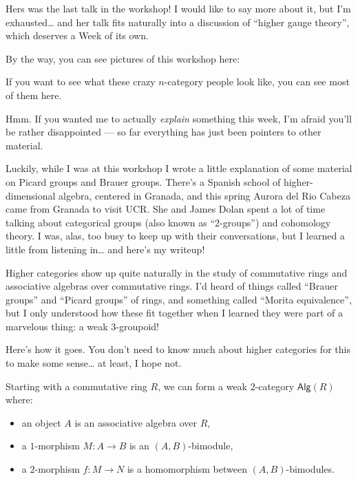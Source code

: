 \documentclass{article}
\def\tightlist{}
\renewcommand{\texttt}[1]{%
  \begingroup
  \ttfamily
  \begingroup\lccode`~=`/\lowercase{\endgroup\def~}{/\discretionary{}{}{}}%
  \begingroup\lccode`~=`[\lowercase{\endgroup\def~}{[\discretionary{}{}{}}%
  \begingroup\lccode`~=`.\lowercase{\endgroup\def~}{.\discretionary{}{}{}}%
  \catcode`/=\active\catcode`[=\active\catcode`.=\active
  \scantokens{#1\noexpand}%
  \endgroup
}
\begin{document}
Hers was the last talk in the workshop! I would like to say more about
it, but I'm exhausted\ldots{} and her talk fits naturally into a
discussion of ``higher gauge theory'', which deserves a Week of its own.

By the way, you can see pictures of this workshop here:


If you want to see what these crazy \(n\)-category people look like, you
can see most of them here.

Hmm. If you wanted me to actually \emph{explain} something this week,
I'm afraid you'll be rather disappointed --- so far everything has just
been pointers to other material.

Luckily, while I was at this workshop I wrote a little explanation of
some material on Picard groups and Brauer groups. There's a Spanish
school of higher-dimensional algebra, centered in Granada, and this
spring Aurora del Rio Cabeza came from Granada to visit UCR. She and
James Dolan spent a lot of time talking about categorical groups (also
known as ``\(2\)-groups'') and cohomology theory. I was, alas, too busy
to keep up with their conversations, but I learned a little from
listening in\ldots{} and here's my writeup!

Higher categories show up quite naturally in the study of commutative
rings and associative algebras over commutative rings. I'd heard of
things called ``Brauer groups'' and ``Picard groups'' of rings, and
something called ``Morita equivalence'', but I only understood how these
fit together when I learned they were part of a marvelous thing: a weak
\(3\)-groupoid!

Here's how it goes. You don't need to know much about higher categories
for this to make some sense\ldots{} at least, I hope not.

Starting with a commutative ring \(R\), we can form a weak
\(2\)-category \(\mathsf{Alg}(R)\) where:

\begin{itemize}
\tightlist
\item
  an object \(A\) is an associative algebra over \(R\),
\item
  a \(1\)-morphism \(M\colon A \to B\) is an \((A,B)\)-bimodule,
\item
  a \(2\)-morphism \(f\colon M \to N\) is a homomorphism between
  \((A,B)\)-bimodules.
\end{itemize}
\end{document}
